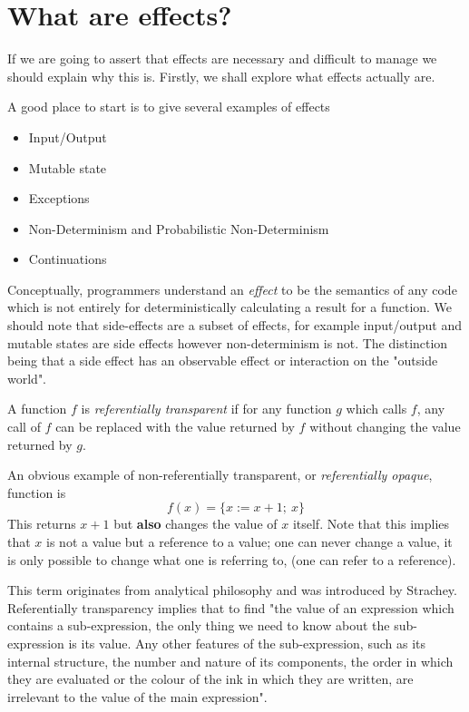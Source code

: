 \section{What are effects?}
If we are going to assert that effects are necessary
and difficult to manage we should explain why this is.
Firstly, we shall explore what effects actually are.\\

\begin{example}
    A good place to start is to give several examples of effects
    \begin{itemize}
        \item Input/Output
        \item Mutable state
        \item Exceptions
        \item Non-Determinism and Probabilistic Non-Determinism
        \item Continuations
    \end{itemize}
\end{example}

Conceptually, programmers understand an \textit{effect} to be the semantics of any code
which is not entirely for deterministically calculating a result for a function.
We should note that side-effects are a subset of effects,
for example input/output and mutable states are side effects
however non-determinism is not.
The distinction being that a side effect
has an observable effect or interaction on the "outside world".\\

\begin{definition}
    A function $f$ is \textit{referentially transparent} if
    for any function $g$ which calls $f$,
    any call of $f$ can be replaced with the value returned by $f$
    without changing the value returned by $g$.

    An obvious example of non-referentially transparent,
    or \textit{referentially opaque}, function is
    \begin{equation}
        f(x) = \{x := x + 1;\ x\}
    \end{equation}
    This returns $x + 1$ but \textbf{also} changes the value of $x$ itself.
    Note that this implies that $x$ is not a value but a reference to a value;
    one can never change a value, it is only possible to change
    what one is referring to, (one can refer to a reference).

    This term originates from analytical philosophy
    and was introduced by Strachey.
    Referentially transparency implies that to find
    "the value of an expression which contains a sub-expression,
    the only thing we need to know about the sub-expression is its value.
    Any other features of the sub-expression,
    such as its internal structure,
    the number and nature of its components,
    the order in which they are evaluated or
    the colour of the ink in which they are written,
    are irrelevant to the value of the main expression"\cite{strachey2000fundamental}.\\
\end{definition}

